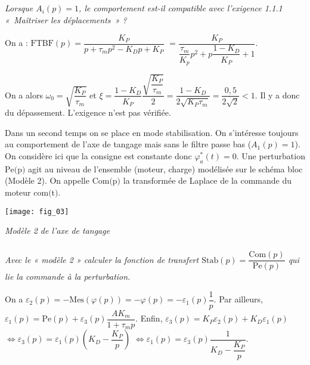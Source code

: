 \begin{multicols}{2}
\subparagraph{}
\textit{Lorsque $A_i(p)=1$, le comportement est-il compatible avec l’exigence 1.1.1 «~Maîtriser les déplacements~» ? }
\ifprof
\begin{corrige}
On a : $\text{FTBF}(p)=
\dfrac{K_P}{p+\tau_m p^2- K_Dp +K_P}$ 
$=\dfrac{K_P}{\dfrac{\tau_m}{K_p} p^2 + p\dfrac{1- K_D}{K_P} +1}$.

On a alors $\omega_0 = \sqrt{\dfrac{K_P}{\tau_m}}$ et $\xi = \dfrac{1- K_D}{K_P} \dfrac{\sqrt{\dfrac{K_P}{\tau_m}}}{2}= \dfrac{1- K_D}{2\sqrt{K_P \tau_m}}= \dfrac{0,5}{2\sqrt{2}} <1$. Il y a donc du dépassement. L'exigence n'est pas vérifiée. 
\end{corrige}
\else
\fi

\ifprof
\else

Dans un second temps on se place en mode stabilisation. On s’intéresse toujours au comportement de l’axe de
tangage mais sans le filtre passe bas ($A_1(p)=1$).
On considère ici que la consigne est constante donc $\varphi^*_a(t)=0$. Une perturbation $\text{Pe(p)}$ agit au niveau de l’ensemble (moteur, charge) modélisée sur le schéma bloc (Modèle 2). On appelle $\text{Com(p)}$ la transformée de Laplace de la commande du moteur $\text{com(t)}$.

\begin{center}
\texttt{[image: fig\_03]}

\textit{Modèle 2 de l’axe de tangage}
\end{center}
\fi

\subparagraph{}
\textit{Avec le « modèle 2 » calculer la fonction de transfert $\text{Stab}(p)=\dfrac{\text{Com}(p)}{\text{Pe}(p)}$ qui lie la commande à la perturbation.}%
\ifprof
\begin{corrige}
On a $\varepsilon_2(p) = -\text{Mes}\left( \varphi(p)\right) = -\varphi(p) = -\varepsilon_1(p)\dfrac{1}{p}$. 
Par ailleurs, $\varepsilon_1(p)=\text{Pe}(p)+\varepsilon_3(p)\dfrac{AK_m}{1+\tau_m p}$. 
Enfin, $\varepsilon_3(p)=K_P\varepsilon_2(p)+K_D \varepsilon_1(p)$ $\Leftrightarrow \varepsilon_3(p)=\varepsilon_1(p)\left(K_D-\dfrac{K_P}{p} \right)$
$\Leftrightarrow \varepsilon_1(p) =\varepsilon_3(p)\dfrac{1}{K_D -\dfrac{K_P}{p} }$. 


\end{corrige}
\end{multicols}
